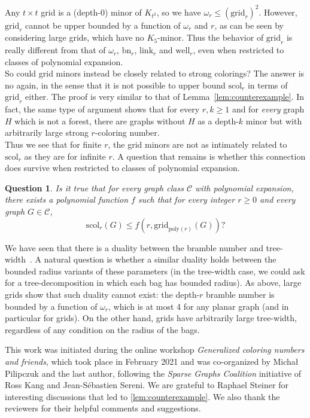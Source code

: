 \documentclass[final]{dmtcs-episciences}
\newtheorem{qn}[thm]{Question}
\theoremstyle{definition}
\theoremstyle{remark}
\newcommand{\poly}{\ensuremath{\mathrm{poly}}}
\newcommand{\scol}{\ensuremath{\mathrm{scol}}}
\newcommand{\bn}{\ensuremath{\mathrm{bn}}}
\newcommand{\GR}{\ensuremath{\mathrm{grid}}}
\newcommand{\link}{\ensuremath{\mathrm{link}}}
\newcommand{\WL}{\ensuremath{\mathrm{well}}}
\renewcommand{\leq}{\leqslant}
\renewcommand{\geq}{\geqslant}
\begin{document}
Any $t \times t$ grid is a (depth-$0$) minor of $K_{t^2}$, so we have $\omega_r \leq (\GR_{r})^2$. However, $\GR_r$ cannot be upper bounded by a function of $\omega_r$ and $r$, as can be seen by considering large grids, which have no $K_5$-minor. Thus the behavior of $\GR_r$ is really different from that of $\omega_r$, $\bn_r$, $\link_r$ and $\WL_r$, even when restricted to classes of polynomial expansion.\\

So could grid minors instead be closely related to strong colorings?
The answer is no again, in the sense that it is not possible to upper bound $\scol_r$ in terms of $\GR_r$ either.
The proof is very similar to that of Lemma~\ref{lem:counterexample}.
In fact, the same type of argument shows that for every $r, k\geq 1$ and for \emph{every} graph $H$ which is not a forest, there are graphs without $H$ as a depth-$k$ minor but with arbitrarily large strong $r$-coloring number.\\



Thus we see that for finite $r$, the grid minors are not as intimately related to  $\scol_r$ as they are for infinite $r$. 
A question that remains is whether this connection does survive when restricted to classes of polynomial expansion.

\begin{qn}
Is it true that for every graph class $\mathcal{C}$ with polynomial expansion, there exists a polynomial function $f$ such that for every integer $r\geq 0$ and every graph $G \in \mathcal{C}$, 
\[
\scol_r(G)\leq f(r,\GR_{\poly(r)}(G))?
\]
\end{qn}

We have seen that there is a duality between the bramble number and tree-width~\cite{ST1993}. A natural question is whether a similar duality holds between the bounded radius variants of these parameters (in the tree-width case, we could ask for a tree-decomposition in which each bag has bounded radius). As above, large grids show that such duality cannot exist: the depth-$r$ bramble number is bounded by a function of $\omega_r$, which is at most 4 for any planar graph (and in particular for grids). On the other hand, grids have arbitrarily large tree-width, regardless of any condition on the radius of the bags.




\acknowledgements
This work was initiated during the online workshop  \textit{Generalized coloring
numbers and friends}, which took place in February 2021 and was co-organized by Micha\l{} Pilipczuk and the last author, following the \emph{Sparse Graphs Coalition} initiative of Ross Kang and Jean-S\'ebastien Sereni. 
We are grateful to Raphael Steiner for interesting discussions that led to \cref{lem:counterexample}. We also thank the reviewers for their helpful comments and suggestions.
\end{document}
